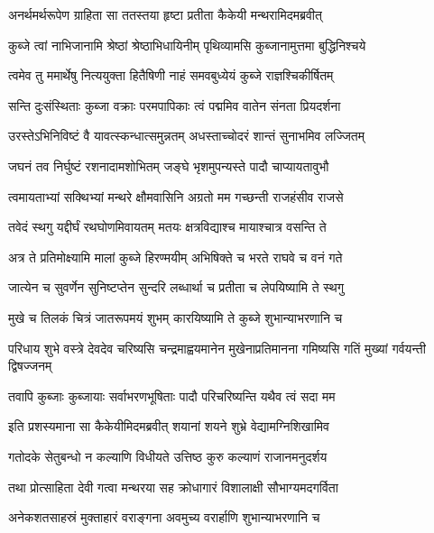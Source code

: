 \twolineshloka
{अनर्थमर्थरूपेण ग्राहिता सा ततस्तया}
{हृष्टा प्रतीता कैकेयी मन्थरामिदमब्रवीत्} %

\twolineshloka
{कुब्जे त्वां नाभिजानामि श्रेष्ठां श्रेष्ठाभिधायिनीम्}
{पृथिव्यामसि कुब्जानामुत्तमा बुद्धिनिश्चये} %

\twolineshloka
{त्वमेव तु ममार्थेषु नित्ययुक्ता हितैषिणी}
{नाहं समवबुध्येयं कुब्जे राज्ञश्चिकीर्षितम्} %

\twolineshloka
{सन्ति दुःसंस्थिताः कुब्जा वक्राः परमपापिकाः}
{त्वं पद्ममिव वातेन संनता प्रियदर्शना} %

\twolineshloka
{उरस्तेऽभिनिविष्टं वै यावत्स्कन्धात्समुन्नतम्}
{अधस्ताच्चोदरं शान्तं सुनाभमिव लज्जितम्} %

\twolineshloka
{जघनं तव निर्घुष्टं रशनादामशोभितम्}
{जङ्घे भृशमुपन्यस्ते पादौ चाप्यायतावुभौ} %

\twolineshloka
{त्वमायताभ्यां सक्थिभ्यां मन्थरे क्षौमवासिनि}
{अग्रतो मम गच्छन्ती राजहंसीव राजसे} %

\twolineshloka
{तवेदं स्थगु यद्दीर्घं रथघोणमिवायतम्}
{मतयः क्षत्रविद्याश्च मायाश्चात्र वसन्ति ते} %

\twolineshloka
{अत्र ते प्रतिमोक्ष्यामि मालां कुब्जे हिरण्मयीम्}
{अभिषिक्ते च भरते राघवे च वनं गते} %

\twolineshloka
{जात्येन च सुवर्णेन सुनिष्टप्तेन सुन्दरि}
{लब्धार्था च प्रतीता च लेपयिष्यामि ते स्थगु} %

\twolineshloka
{मुखे च तिलकं चित्रं जातरूपमयं शुभम्}
{कारयिष्यामि ते कुब्जे शुभान्याभरणानि च} %

\threelineshloka
{परिधाय शुभे वस्त्रे देवदेव चरिष्यसि}
{चन्द्रमाह्वयमानेन मुखेनाप्रतिमानना}
{गमिष्यसि गतिं मुख्यां गर्वयन्ती द्विषज्जनम्} %

\twolineshloka
{तवापि कुब्जाः कुब्जायाः सर्वाभरणभूषिताः}
{पादौ परिचरिष्यन्ति यथैव त्वं सदा मम} %

\twolineshloka
{इति प्रशस्यमाना सा कैकेयीमिदमब्रवीत्}
{शयानां शयने शुभ्रे वेद्यामग्निशिखामिव} %

\twolineshloka
{गतोदके सेतुबन्धो न कल्याणि विधीयते}
{उत्तिष्ठ कुरु कल्याणं राजानमनुदर्शय} %

\twolineshloka
{तथा प्रोत्साहिता देवी गत्वा मन्थरया सह}
{क्रोधागारं विशालाक्षी सौभाग्यमदगर्विता} %

\twolineshloka
{अनेकशतसाहस्रं मुक्ताहारं वराङ्गना}
{अवमुच्य वरार्हाणि शुभान्याभरणानि च} %

